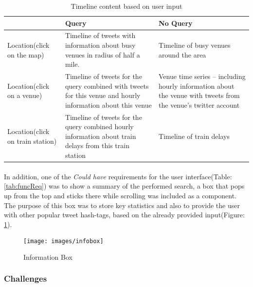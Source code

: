\documentclass{l4proj}
\begin{document}
\begin{table}[H]
	\centering
	\begin{tabular}{|p{2cm}|p{7cm}|p{7cm}|} \hline
		&	Query	& No Query \\ \hline
		Location(click on the map) 	& Timeline of tweets with information about busy venues	in radius of half a mile.	& Timeline of busy venues around the area  \\ \hline
		Location(click on a venue)	& Timeline of tweets for the query combined with tweets for this venue and hourly information about this venue	& Venue time series – including	hourly information about the venue with tweets from the venue’s twitter account  \\ \hline
		Location(click on train station)	& Timeline of tweets for the query combined hourly information about train delays from this train station & 	Timeline of train delays \\ \hline
	\end{tabular}
	\caption{Timeline content based on user input}
	\label{tab:contentuserinput}
\end{table}


\paragraph{}
In addition, one of the \textit{Could have} requirements for the user interface(Table: \ref{tab:funcReq}) was to show a summary of the performed search, a box that pops up from the top and sticks there while scrolling was included as a component. The purpose of this box was to store key statistics and also to provide the user with other popular tweet hash-tags, based on the already provided input(Figure: \ref{zebrainfobox}).  

\begin{figure}[H]
	\centering
	\texttt{[image: images/infobox]}
	\label{zebrainfobox}
	\caption{Information Box}
\end{figure}

\subsubsection{Challenges}
\end{document}

